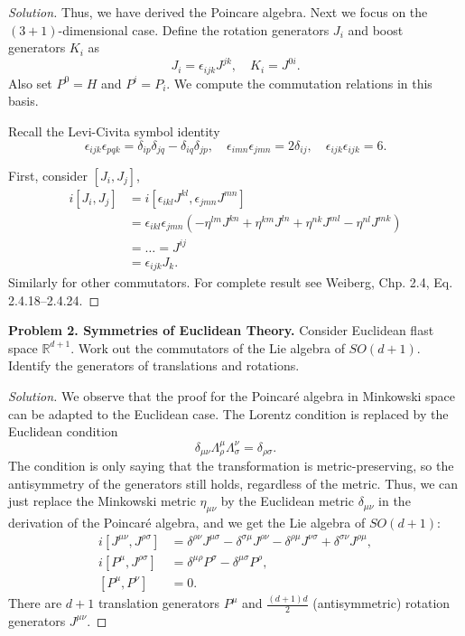 \begin{proof}[Solution]
	Thus, we have derived the Poincare algebra. Next we focus on the $(3 + 1)$-dimensional case. Define the rotation generators $J_i$ and boost generators $K_i$ as
	\[
	J_i = \epsilon_{ijk} J^{jk}, \quad K_i = J^{0i}.
	\]
	Also set $P^0 = H$ and $P^i = P_i$. We compute the commutation relations in this basis. 

	Recall the Levi-Civita symbol identity
	\[
		\epsilon_{i j k} \epsilon_{p q k} = \delta_{i p} \delta_{j q} - \delta_{i q} \delta_{j p}, \quad
		\epsilon_{i m n} \epsilon_{j m n} = 2 \delta_{i j}, \quad
		\epsilon_{i j k} \epsilon_{i j k} = 6.
	\]

	First, consider $[J_i, J_j]$,
	\begin{align*}
		i[J_i, J_j] 
		&= i[\epsilon_{i k l} J^{k l}, \epsilon_{j m n} J^{m n}] \\
		&= \epsilon_{i k l} \epsilon_{j m n} (-\eta^{l m} J^{k n} + \eta^{k m} J^{l n} + \eta^{n k} J^{m l} - \eta^{n l} J^{m k}) \\
		&= \dots = J^{i j}\\
		&= \epsilon_{i j k} J_k.
	\end{align*}
	Similarly for other commutators. For complete result see Weiberg, Chp. 2.4, Eq. 2.4.18--2.4.24.

\end{proof}

\textbf{Problem 2. Symmetries of Euclidean Theory.} Consider Euclidean flast space $\mathbb{R}^{d + 1}$. Work out the commutators of the Lie algebra of $SO(d + 1)$. Identify the generators of translations and rotations.

\begin{proof}[Solution]
	We observe that the proof for the Poincaré algebra in Minkowski space can be adapted to the Euclidean case. The Lorentz condition is replaced by the Euclidean condition
	\[\delta_{\mu \nu} \Lambda^\mu _ \rho \Lambda^\nu _ \sigma = \delta_{\rho \sigma}.\]
	The condition is only saying that the transformation is metric-preserving, so the antisymmetry of the generators still holds, regardless of the metric. Thus, we can just replace the Minkowski metric $\eta_{\mu \nu}$ by the Euclidean metric $\delta_{\mu \nu}$ in the derivation of the Poincaré algebra, and we get the Lie algebra of $SO(d + 1)$:
	\begin{align*}
		i[J^{\mu \nu}, J^{\rho \sigma}]
		&= \delta^{\rho \nu} J^{\mu \sigma} - \delta^{\sigma \mu} J^{\rho \nu} - \delta^{\rho \mu} J^{\nu \sigma} + \delta^{\sigma \nu} J^{\rho \mu},\\
		i[P^\mu, J^{\rho \sigma}]
		&= \delta^{\mu \rho} P^\sigma - \delta^{\mu \sigma} P^\rho,\\
		[P^\mu, P^\nu] &= 0.
	\end{align*}
	There are $d+1$ translation generators $P^\mu$ and $\frac{(d + 1)d}{2}$ (antisymmetric) rotation generators $J^{\mu \nu}$.
\end{proof}

